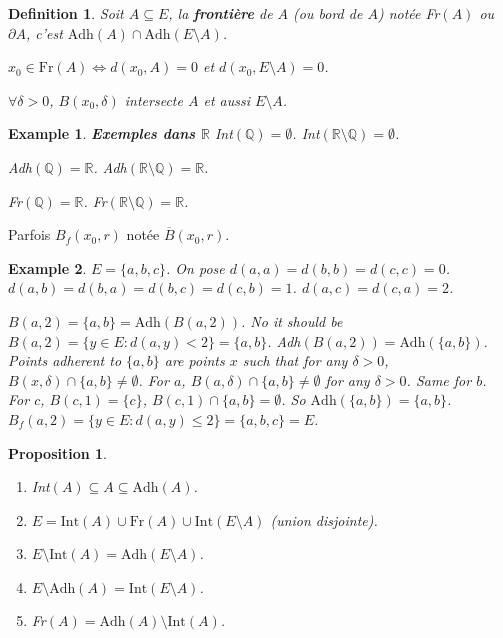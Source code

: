 \documentclass{article}
\newtheorem{proposition}{Proposition}
\newtheorem{definition}{Definition}
\newtheorem{example}{Example}
\begin{document}
\begin{definition}
Soit $A \subseteq E$, la \textbf{frontière} de $A$ (ou bord de $A$) notée Fr$(A)$ ou $\partial A$, c'est $\text{Adh}(A) \cap \text{Adh}(E \setminus A)$.

$x_0 \in \text{Fr}(A) \iff d(x_0, A) = 0$ et $d(x_0, E \setminus A) = 0$.

$\forall \delta > 0$, $B(x_0, \delta)$ intersecte $A$ et aussi $E \setminus A$.
\end{definition}

\begin{example}
\textbf{Exemples dans $\mathbb{R}$}
Int$(\mathbb{Q}) = \emptyset$.
Int$(\mathbb{R} \setminus \mathbb{Q}) = \emptyset$.

Adh$(\mathbb{Q}) = \mathbb{R}$.
Adh$(\mathbb{R} \setminus \mathbb{Q}) = \mathbb{R}$.

Fr$(\mathbb{Q}) = \mathbb{R}$.
Fr$(\mathbb{R} \setminus \mathbb{Q}) = \mathbb{R}$.
\end{example}

Parfois $B_f(x_0, r)$ notée $\overline{B}(x_0, r)$.

\begin{example}
$E = \{a, b, c\}$.
On pose $d(a, a) = d(b, b) = d(c, c) = 0$.
$d(a, b) = d(b, a) = d(b, c) = d(c, b) = 1$.
$d(a, c) = d(c, a) = 2$.

$B(a, 2) = \{a, b\} = \text{Adh}(B(a, 2))$. No it should be $B(a,2) = \{y \in E : d(a,y) < 2\} = \{a, b\}$.  Adh$(B(a, 2)) = \text{Adh}(\{a,b\})$. Points adherent to $\{a,b\}$ are points $x$ such that for any $\delta>0$, $B(x,\delta) \cap \{a,b\} \ne \emptyset$.
For $a$, $B(a, \delta) \cap \{a,b\} \ne \emptyset$ for any $\delta > 0$. Same for $b$. For $c$, $B(c, 1) = \{c\}$, $B(c, 1) \cap \{a,b\} = \emptyset$. So $\text{Adh}(\{a,b\}) = \{a,b\}$.
$B_f(a, 2) = \{y \in E : d(a,y) \leq 2\} = \{a, b, c\} = E$.
\end{example}


\begin{proposition}
\begin{enumerate}
    \item Int$(A) \subseteq A \subseteq \text{Adh}(A)$.
    \item $E = \text{Int}(A) \cup \text{Fr}(A) \cup \text{Int}(E \setminus A)$ (union disjointe).
    \item $E \setminus \text{Int}(A) = \text{Adh}(E \setminus A)$.
    \item $E \setminus \text{Adh}(A) = \text{Int}(E \setminus A)$.
    \item Fr$(A) = \text{Adh}(A) \setminus \text{Int}(A)$.
\end{enumerate}
\end{proposition}
\end{document}
